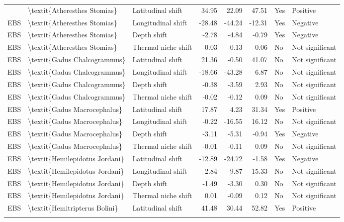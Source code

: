 \begin{longtable}[t]{lllrrrll}
{{EBS & \textbackslash{}textit\{Atheresthes Stomias\} & Latitudinal shift & 34.95 & 22.09 & 47.51 & Yes & Positive\\
EBS & \textbackslash{}textit\{Atheresthes Stomias\} & Longitudinal shift & -28.48 & -44.24 & -12.31 & Yes & Negative\\
EBS & \textbackslash{}textit\{Atheresthes Stomias\} & Depth shift & -2.78 & -4.84 & -0.79 & Yes & Negative\\
EBS & \textbackslash{}textit\{Atheresthes Stomias\} & Thermal niche shift & -0.03 & -0.13 & 0.06 & No & Not significant\\
\addlinespace
EBS & \textbackslash{}textit\{Gadus Chalcogrammus\} & Latitudinal shift & 21.36 & -0.50 & 41.07 & No & Not significant\\
EBS & \textbackslash{}textit\{Gadus Chalcogrammus\} & Longitudinal shift & -18.66 & -43.28 & 6.87 & No & Not significant\\
EBS & \textbackslash{}textit\{Gadus Chalcogrammus\} & Depth shift & -0.38 & -3.59 & 2.93 & No & Not significant\\
EBS & \textbackslash{}textit\{Gadus Chalcogrammus\} & Thermal niche shift & -0.02 & -0.12 & 0.09 & No & Not significant\\
EBS & \textbackslash{}textit\{Gadus Macrocephalus\} & Latitudinal shift & 17.87 & 4.23 & 31.34 & Yes & Positive\\
\addlinespace
EBS & \textbackslash{}textit\{Gadus Macrocephalus\} & Longitudinal shift & -0.22 & -16.55 & 16.12 & No & Not significant\\
EBS & \textbackslash{}textit\{Gadus Macrocephalus\} & Depth shift & -3.11 & -5.31 & -0.94 & Yes & Negative\\
EBS & \textbackslash{}textit\{Gadus Macrocephalus\} & Thermal niche shift & -0.01 & -0.11 & 0.09 & No & Not significant\\
EBS & \textbackslash{}textit\{Hemilepidotus Jordani\} & Latitudinal shift & -12.89 & -24.72 & -1.58 & Yes & Negative\\
EBS & \textbackslash{}textit\{Hemilepidotus Jordani\} & Longitudinal shift & 2.84 & -9.87 & 15.33 & No & Not significant\\
\addlinespace
EBS & \textbackslash{}textit\{Hemilepidotus Jordani\} & Depth shift & -1.49 & -3.30 & 0.30 & No & Not significant\\
EBS & \textbackslash{}textit\{Hemilepidotus Jordani\} & Thermal niche shift & 0.01 & -0.09 & 0.12 & No & Not significant\\
EBS & \textbackslash{}textit\{Hemitripterus Bolini\} & Latitudinal shift & 41.48 & 30.44 & 52.82 & Yes & Positive\\
}}
\end{longtable}
